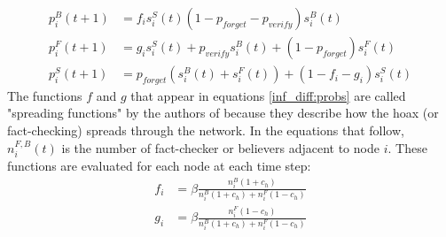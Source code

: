 \documentclass[conference]{IEEEtran}
\begin{document}
\begin{align}\label{inf_diff:probs}
    p^{B}_{i}(t+1) &= f_{i}s_{i}^{S}(t) \left(1 - p_{forget} - p_{verify}\right)s_{i}^{B}(t)\\
    p^{F}_{i}(t+1) &= g_{i}s_{i}^{S}(t) + p_{verify}s_{i}^{B}(t)+ (1 - p_{forget})s_{i}^{F}(t)\\
    p^{S}_{i}(t+1) &= p_{forget}\left(s_{i}^{B}(t) + s_{i}^{F}(t)\right) + \left(1 - f_{i} - g_{i}\right)s_{i}^{S}(t)
\end{align}
The functions $f$ and $g$ that appear in equations \ref{inf_diff:probs} are called "spreading functions" by the authors of \cite{Tambuscio15} because they describe how the hoax (or fact-checking) spreads through the network. In the equations that follow, $n_{i}^{F,B}(t)$ is the number of fact-checker or believers adjacent to node $i$. These functions are evaluated for each node at each time step:
\begin{align}
    f_{i} &= \beta\frac{n_{i}^{B}(1 + c_{h})}{n_{i}^{B}(1+c_{h})+n_{i}^{F}(1-c_{h})}\\
    g_{i} &= \beta\frac{n_{i}^{F}(1 - c_{h})}{n_{i}^{B}(1+c_{h})+n_{i}^{F}(1-c_{h})}
\end{align}
\end{document}
